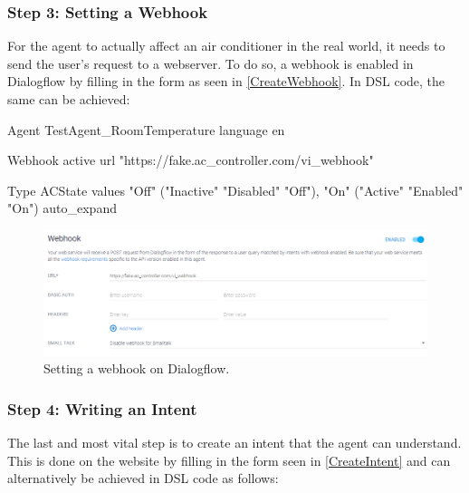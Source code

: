 \subsubsection{Step 3: Setting a Webhook}
For the agent to actually affect an air conditioner in the real world, it needs to send the user's request to a webserver. To do so, a webhook is enabled in Dialogflow by filling in the form as seen in \autoref{CreateWebhook}.
In DSL code, the same can be achieved:
\begin{samepage}
    \begin{DSL}
    Agent TestAgent_RoomTemperature
        language en 
            
        Webhook 
            active 
            url "https://fake.ac_controller.com/vi_webhook"

        Type ACState
            values 
                "Off" ("Inactive" "Disabled" "Off"),
                "On" ("Active" "Enabled" "On")
            auto_expand
    \end{DSL}
\end{samepage}

\begin{figure}[!htb]
    \centering
    \includegraphics[width=1\textwidth]{Thesis_Images/CreateWebhook.PNG}
    \caption{Setting a webhook on Dialogflow.}
        \label{CreateWebhook}
\end{figure}

\subsubsection{Step 4: Writing an Intent}

The last and most vital step is to create an intent that the agent can understand. This is done on the website by filling in the form seen in \autoref{CreateIntent} and can alternatively be achieved in DSL code as follows:

